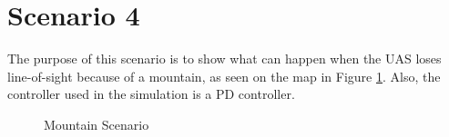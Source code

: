\section{Scenario 4}\label{sec:scenario4}
The purpose of this scenario is to show what can happen when the UAS loses line-of-sight because of a mountain, as seen on the map in Figure \ref{fig:s4_map}. Also, the controller used in the simulation is a PD controller.

\begin{figure}[H]
\hfill
{}
\hfill
{}
\hfill
\caption{Mountain Scenario}
\label{fig:s4_map}
\end{figure}

